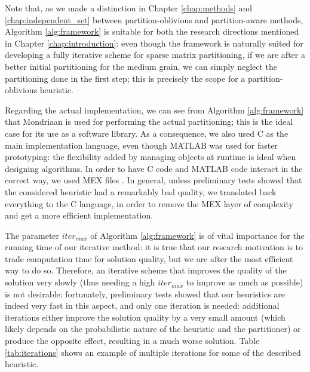 Note that, as we made a distinction in Chapter \ref{chap:methods} and \ref{chap:independent_set} between partition-oblivious and partition-aware methods, Algorithm \ref{alg:framework} is suitable for both the research directions mentioned in Chapter \ref{chap:introduction}: even though the framework is naturally suited for developing a fully iterative scheme for sparse matrix partitioning, if we are after a better initial partitioning for the medium grain, we can simply neglect the partitioning done in the first step; this is precisely the scope for a partition-oblivious heuristic.

Regarding the actual implementation, we can see from Algorithm \ref{alg:framework} that Mondriaan is used for performing the actual partitioning; this is the ideal case for its use as a software library. As a consequence, we also used C as the main implementation language, even though MATLAB was used for faster prototyping: the flexibility added by managing objects at runtime  is ideal when designing algorithms. In order to have C code and MATLAB code interact in the correct way, we used MEX files \cite{mex}. In general, unless preliminary tests showed that the considered heuristic had a remarkably bad quality, we translated back everything to the C language, in order to remove the MEX layer of complexity and get a more efficient implementation.

The parameter $iter_{max}$ of Algorithm \ref{alg:framework} is of vital importance for the running time of our iterative method: it is true that our research motivation is to trade computation time for solution quality, but we are after the most efficient way to do so. Therefore, an iterative scheme that improves the quality of the solution very slowly (thus needing a high $iter_{max}$ to improve as much as possible) is not desirable; fortunately, preliminary tests showed that our heuristics are indeed very fast in this aspect, and only one iteration is needed: additional iterations either improve the solution quality by a very small amount (which likely depends on the probabilistic nature of the heuristic and the partitioner) or produce the opposite effect, resulting in a much worse solution. Table \ref{tab:iterations} shows an example of multiple iterations for some of the described heuristic.

